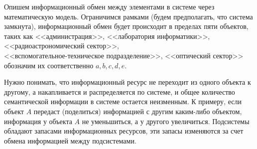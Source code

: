 Опишем информационный обмен между элементами в системе через математическую модель. Ограничимся рамками (будем предполагать, что система замкнута), информационный обмен будет  происходит в пределах пяти объектов, таких как <<администрация>>, <<лаборатория информатики>>, <<радиоастрономический сектор>>, \\<<вспомогательное-техническое подразделение>>, <<оптический сектор>> обозначим их соответственно $a, b, c, d, e$. 

Нужно понимать, что информационный ресурс не переходит из одного объекта к другому, а накапливается и распределяется по системе, и общее количество семантической информации в системе остается неизменным. К примеру, если объект $A$ передаст (поделиться) информацией с другим каким-либо объектом, информация у объекта $A$ не уменьшиться, а у другого увеличиться. Подсистемы обладают запасами информационных ресурсов, эти запасы изменяются за счет обмена информацией между подсистемами. 

 


\pagebreak